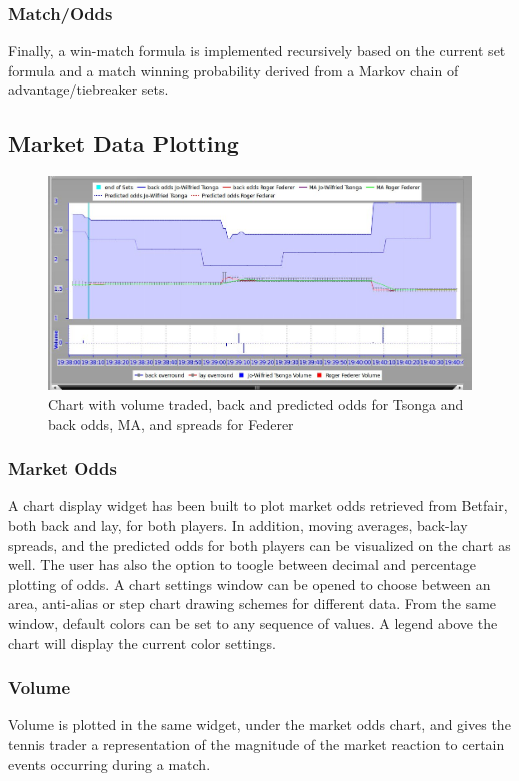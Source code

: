 \documentclass[10pt]{report}
\begin{document}
\subsubsection {Match/Odds}
Finally, a win-match formula is implemented recursively based on the current set formula and a match winning probability derived from a Markov chain of advantage/tiebreaker sets.


\subsection {Market Data Plotting}
\begin{figure}[ht]
\centering
\includegraphics[bb=0 0 1100 350, scale = 0.34]{features-screenshots/chart.jpg}
\caption{Chart with volume traded, back and predicted odds for Tsonga and back odds, MA, and spreads for Federer}
\end{figure}

\subsubsection {Market Odds}
A chart display widget has been built to plot market odds retrieved from Betfair, both back and lay, for both players. In addition, moving averages, back-lay spreads, and the predicted odds for both players can be visualized on the chart as well. The user has also the option to toogle between decimal and percentage plotting of odds. A chart settings window can be opened to choose between an area, anti-alias or step chart drawing schemes for different data. From the same window, default colors can be set to any sequence of values. A legend above the chart will display the current color settings.
\subsubsection {Volume}
Volume is plotted in the same widget, under the market odds chart, and gives the tennis trader a representation of the magnitude of the market reaction to certain events occurring during a match.
\end{document}
